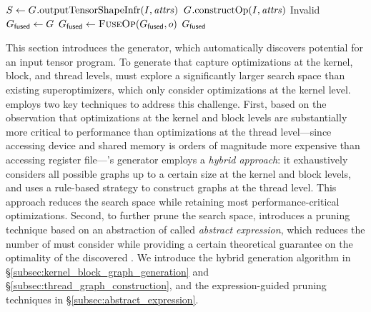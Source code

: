 \begin{algorithm}[h]
\begin{algorithmic}[1]
    \label{line:expr_check}
    \State $S \gets G_{\mathsf{}}.\mathrm{outputTensorShapeInfr}(I, \mathit{attrs})$
     \label{line:tensor_shape_check}
         \label{line:memory_check}
            \State \Return $G_{\mathsf{}}.\mathrm{constructOp}(I, \mathit{attrs})$
        \EndIf
    \EndIf
    \State \Return Invalid
\EndFunction \label{line:end_op}
\Statex
{}
    \State $G_{\mathsf{fused}} \gets G$
        \State $\GF{fused} \gets \Call{FuseOp}{\GF{fused}, o}$
    \EndWhile
    \State \Return $G_{\mathsf{fused}}$
\EndFunction

\end{algorithmic}
\end{algorithm}


This section introduces the \sys \graph generator, which automatically discovers potential \graphs for an input tensor program.
To generate \graphs that capture optimizations at the kernel, block, and thread levels, \sys must explore a significantly larger search space than existing superoptimizers, which only consider optimizations at the kernel level. 
%
\sys employs two key techniques to address this challenge.
%
First, based on the observation that optimizations at the kernel and block levels are substantially more critical to performance than optimizations at the thread level---since accessing device and shared memory is orders of magnitude more expensive than accessing register file---\sys's \graph generator employs a {\em hybrid approach}: it exhaustively considers all possible graphs up to a certain size at the kernel and block levels, and uses a rule-based strategy to construct graphs at the thread level. This approach reduces the search space while retaining most performance-critical optimizations.
%
Second, to further prune the search space, \sys introduces a pruning technique based on an abstraction of \graphs called {\em abstract expression}, which reduces the number of \graphs \sys must consider while providing a certain theoretical guarantee on the optimality of the discovered \graphs.
%
We introduce the hybrid \graph generation algorithm in \S\ref{subsec:kernel_block_graph_generation} and \S\ref{subsec:thread_graph_construction}, and the expression-guided pruning techniques in \S\ref{subsec:abstract_expression}.


